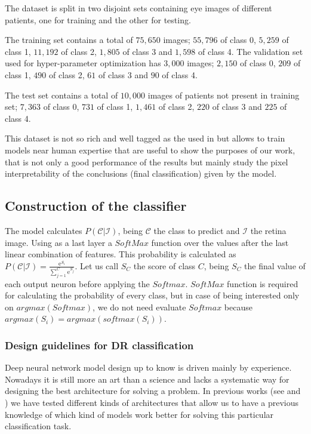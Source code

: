 \documentclass[review]{elsarticle}
\theoremstyle{definition} %
\theoremstyle{remark}
\newcommand{\me}{\mathrm{e}} %
\begin{document}
The dataset is split in two disjoint sets containing eye images of different patients, one for training and the other for testing.

The training set contains a total of $75,650$ images; $55,796$ of class 0, $5,259$ of class 1, $11,192$ of class 2, $1,805$ of class 3 and $1,598$ of class 4. The validation set used for hyper-parameter optimization has $3,000$ images; $2,150$ of class 0, $209$ of class 1, $490$ of class 2, $61$ of class 3 and $90$ of class 4. 

The test set contains a total of $10,000$ images of patients not present in training set; $7,363$ of class 0, $731$ of class 1, $1,461$ of class 2, $220$ of class 3 and $225$ of class 4. 

This dataset is not so rich and well tagged as the used in \cite{doi:10.1001/jama.2016.17216} but allows to train models near human expertise that are useful to show the purposes of our work, that is not only a good performance of the results but mainly study the pixel interpretability of the conclusions (final classification) given by the model.

\subsection{Construction of the classifier}

The model calculates $P(\mathcal{C} | \mathcal{I})$, being $\mathcal{C}$ the class to predict and $\mathcal{I}$ the retina image. Using as a last layer a $SoftMax$ function over the values after the last linear combination of features. This probability is calculated as $P(\mathcal{C} | \mathcal{I}) = \frac{\me^{S_{i}}}{\sum_{j=1}^{C} \me^{S_{j}}}$. Let us call $S_{C}$ the score of class $C$, being $S_C$ the final value of each output neuron before applying the $Softmax$. $SoftMax$ function is required for calculating the probability of every class, but in case of being interested only on $argmax(Softmax)$, we do not need evaluate $Softmax$ because $argmax(S_i) = argmax(softmax(S_i))$.

\subsubsection{Design guidelines for DR classification}

Deep neural network model design up to know is driven mainly by experience. Nowadays it is still more an art than a science and lacks a systematic way for designing the best architecture for solving a problem. In previous works (see \cite{jdelatorre-2016} and \cite{DELATORRE2017}) we have tested different kinds of architectures that allow us to have a previous knowledge of which kind of models work better for solving this particular classification task.
\end{document}

